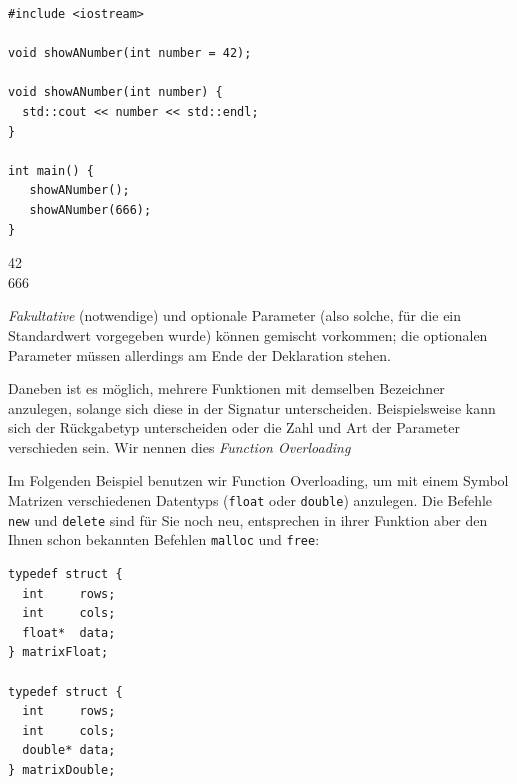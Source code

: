 \begin{codebox}
\begin{verbatim}
#include <iostream>

void showANumber(int number = 42);

void showANumber(int number) {
  std::cout << number << std::endl;
}

int main() {
   showANumber();
   showANumber(666);
}
\end{verbatim}
\end{codebox}

\begin{cmdbox}
42\\
666
\end{cmdbox}

\emph{Fakultative} (notwendige) und optionale Parameter (also solche, für die ein Standardwert vorgegeben wurde) können gemischt vorkommen; die optionalen Parameter müssen allerdings am Ende der Deklaration stehen.

Daneben ist es möglich, mehrere Funktionen mit demselben Bezeichner anzulegen, solange sich diese in der Signatur unterscheiden. Beispielsweise kann sich der Rückgabetyp unterscheiden oder die Zahl und Art der Parameter verschieden sein. Wir nennen dies \emph{Function Overloading}

Im Folgenden Beispiel benutzen wir Function Overloading, um mit einem Symbol Matrizen verschiedenen Datentyps (\texttt{float} oder \texttt{double}) anzulegen. Die Befehle \texttt{new} und \texttt{delete} sind für Sie noch neu, entsprechen in ihrer Funktion aber den Ihnen schon bekannten Befehlen \texttt{malloc} und \texttt{free}:

\begin{codebox}
\begin{verbatim}
typedef struct {
  int     rows;
  int     cols;
  float*  data;
} matrixFloat;

typedef struct {
  int     rows;
  int     cols;
  double* data;
} matrixDouble;
\end{verbatim}
\end{codebox}


